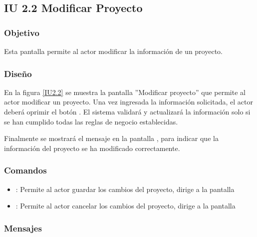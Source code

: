 \subsection{IU 2.2 Modificar Proyecto}

\subsubsection{Objetivo}
	Esta pantalla permite al actor modificar la información de un proyecto.
\subsubsection{Diseño}
	En la figura \ref{IU2.2} se muestra la pantalla ''Modificar proyecto'' que permite al actor modificar un proyecto.
	Una vez ingresada la información solicitada, el actor deberá oprimir el botón  . El sistema validará y actualizará la información solo si se han cumplido todas las reglas de negocio establecidas.
	
	Finalmente se mostrará el mensaje  en la pantalla , para indicar que la información del proyecto se ha modificado correctamente.

\label{IU2.2}
\subsubsection{Comandos}
\begin{itemize}
	\item {}: Permite al actor guardar los cambios del proyecto, dirige a la pantalla 
	\item {}: Permite al actor cancelar los cambios del proyecto, dirige a la pantalla 
\end{itemize}

\subsubsection{Mensajes}

